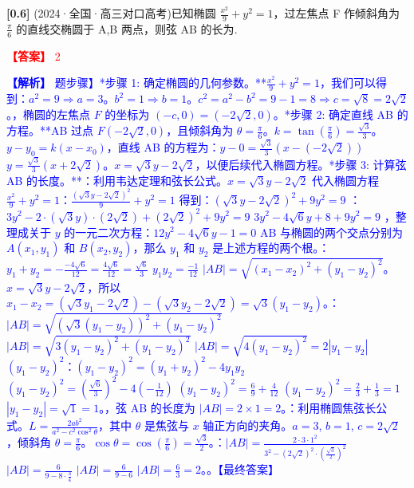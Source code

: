 \documentclass[varwidth=16cm, border=2mm]{standalone}
\begin{document}
\textbf{[0.6]} (2024·全国·高三对口高考)已知椭圆 $\frac{x^2}{9} + y^2 = 1$，过左焦点 F 作倾斜角为 $\frac{\pi}{6}$ 的直线交椭圆于 A,B 两点，则弦 AB 的长为\underline{\hspace{1.5cm}}.

\vspace{0.2cm}\par\noindent\textcolor{red}{\textbf{【答案】} 2}
\par\noindent\textcolor{blue}{\textbf{【解析】} 题步骤】\n**步骤 1: 确定椭圆的几何参数。** $\frac{x^2}{9} + y^2 = 1$，我们可以得到： $a^2 = 9 \Rightarrow a = 3$。 $b^2 = 1 \Rightarrow b = 1$。 $c^2 = a^2 - b^2 = 9 - 1 = 8 \Rightarrow c = \sqrt{8} = 2\sqrt{2}$。，椭圆的左焦点 $F$ 的坐标为 $(-c, 0) = (-2\sqrt{2}, 0)$。\n\n**步骤 2: 确定直线 AB 的方程。** AB 过点 $F(-2\sqrt{2}, 0)$，且倾斜角为 $\theta = \frac{\pi}{6}$。 $k = \tan(\frac{\pi}{6}) = \frac{\sqrt{3}}{3}$。 $y - y_0 = k(x - x_0)$，直线 AB 的方程为：\n$y - 0 = \frac{\sqrt{3}}{3}(x - (-2\sqrt{2}))$  $y = \frac{\sqrt{3}}{3}(x + 2\sqrt{2})$。 $x = \sqrt{3}y - 2\sqrt{2}$，以便后续代入椭圆方程。\n\n**步骤 3: 计算弦 AB 的长度。**：利用韦达定理和弦长公式。 $x = \sqrt{3}y - 2\sqrt{2}$ 代入椭圆方程 $\frac{x^2}{9} + y^2 = 1$：\n$\frac{(\sqrt{3}y - 2\sqrt{2})^2}{9} + y^2 = 1$  得到：\n$(\sqrt{3}y - 2\sqrt{2})^2 + 9y^2 = 9$ ：\n$3y^2 - 2 \cdot (\sqrt{3}y) \cdot (2\sqrt{2}) + (2\sqrt{2})^2 + 9y^2 = 9$ \n$3y^2 - 4\sqrt{6}y + 8 + 9y^2 = 9$ ，整理成关于 $y$ 的一元二次方程：\n$12y^2 - 4\sqrt{6}y - 1 = 0$  AB 与椭圆的两个交点分别为 $A(x_1, y_1)$ 和 $B(x_2, y_2)$，那么 $y_1$ 和 $y_2$ 是上述方程的两个根。：\n$y_1 + y_2 = -\frac{-4\sqrt{6}}{12} = \frac{4\sqrt{6}}{12} = \frac{\sqrt{6}}{3}$ \n$y_1 y_2 = \frac{-1}{12}$  $|AB| = \sqrt{(x_1 - x_2)^2 + (y_1 - y_2)^2}$。 $x = \sqrt{3}y - 2\sqrt{2}$，所以 $x_1 - x_2 = (\sqrt{3}y_1 - 2\sqrt{2}) - (\sqrt{3}y_2 - 2\sqrt{2}) = \sqrt{3}(y_1 - y_2)$。：\n$|AB| = \sqrt{(\sqrt{3}(y_1 - y_2))^2 + (y_1 - y_2)^2}$ \n$|AB| = \sqrt{3(y_1 - y_2)^2 + (y_1 - y_2)^2}$ \n$|AB| = \sqrt{4(y_1 - y_2)^2} = 2|y_1 - y_2|$  $(y_1 - y_2)^2$：\n$(y_1 - y_2)^2 = (y_1 + y_2)^2 - 4y_1 y_2$ \n$(y_1 - y_2)^2 = (\frac{\sqrt{6}}{3})^2 - 4(-\frac{1}{12})$ \n$(y_1 - y_2)^2 = \frac{6}{9} + \frac{4}{12}$ \n$(y_1 - y_2)^2 = \frac{2}{3} + \frac{1}{3} = 1$  $|y_1 - y_2| = \sqrt{1} = 1$。，弦 AB 的长度为 $|AB| = 2 \times 1 = 2$。\n{}：利用椭圆焦弦长公式。 $L = \frac{2ab^2}{a^2 - c^2\cos^2\theta}$，其中 $\theta$ 是焦弦与 $x$ 轴正方向的夹角。 $a=3$, $b=1$, $c=2\sqrt{2}$，倾斜角 $\theta = \frac{\pi}{6}$。 $\cos\theta = \cos(\frac{\pi}{6}) = \frac{\sqrt{3}}{2}$。：\n$|AB| = \frac{2 \cdot 3 \cdot 1^2}{3^2 - (2\sqrt{2})^2 \cdot (\frac{\sqrt{3}}{2})^2}$ \n$|AB| = \frac{6}{9 - 8 \cdot \frac{3}{4}}$ \n$|AB| = \frac{6}{9 - 6}$ \n$|AB| = \frac{6}{3} = 2$。。\n\n【最终答案】}
\end{document}
